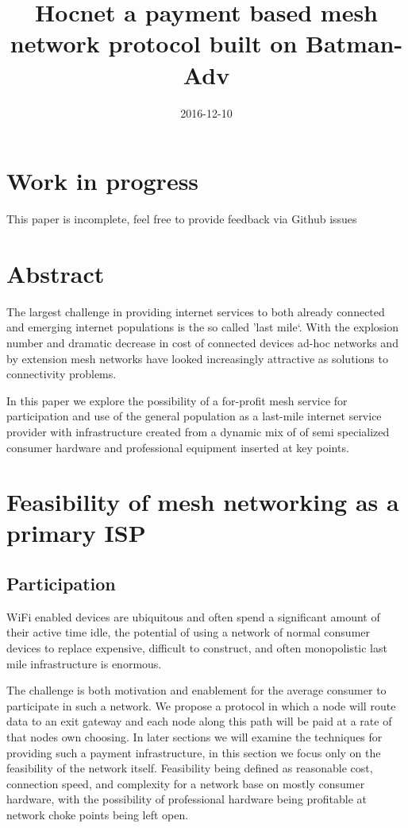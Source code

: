 \documentclass[11pt]{article}
\title{\textbf{Hocnet a payment based mesh network protocol built on Batman-Adv}}
\date{2016-12-10}
\begin{document}
\maketitle

\section{Work in progress}

This paper is incomplete, feel free to provide feedback via Github issues

\tableofcontents

\section{Abstract}

The largest challenge in providing internet services to both already connected and emerging internet populations is the so called 'last mile`. With the explosion number and dramatic decrease in cost of connected devices ad-hoc networks and by extension mesh networks have looked increasingly attractive as solutions to connectivity problems.

In this paper we explore the possibility of a for-profit mesh service for participation and use of the general population as a last-mile internet service provider with infrastructure created from a dynamic mix of of semi specialized consumer hardware and professional equipment inserted at key points. 

\section{Feasibility of mesh networking as a primary ISP} 

    \subsection{Participation}

    WiFi enabled devices are ubiquitous and often spend a significant amount of their active time idle, the potential of using a network of normal consumer devices to replace expensive, difficult to construct, and often monopolistic last mile infrastructure is enormous. 

    The challenge is both motivation and enablement for the average consumer to participate in such a network. We propose a protocol in which a node will route data to an exit gateway and each node along this path will be paid at a rate of that nodes own choosing. In later sections we will examine the techniques for providing such a payment infrastructure, in this section we focus only on the feasibility of the network itself. Feasibility being defined as reasonable cost, connection speed, and complexity for a network base on mostly consumer hardware, with the possibility of professional hardware being profitable at network choke points being left open. 
\end{document}
